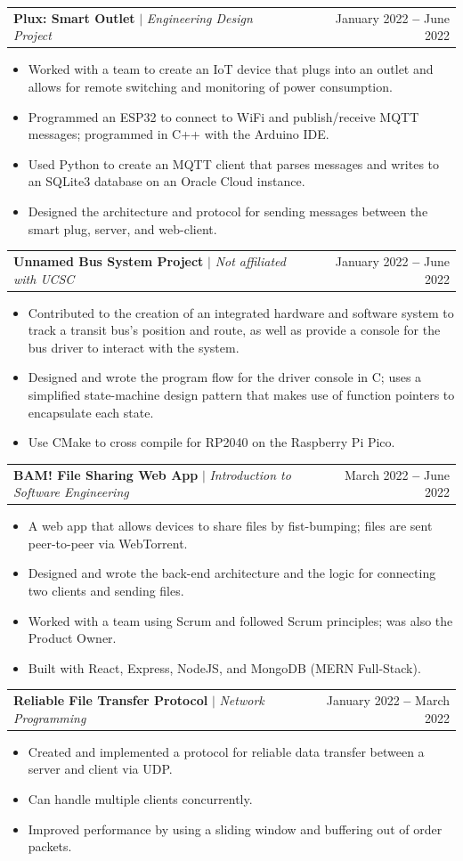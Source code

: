 \documentclass[letterpaper,11pt]{article}
\makeatletter
\newcommand{\resumeItem}[1]{
  \item\small{
    {#1 \vspace{-2pt}}
  }
}
\newcommand{\resumeProjectHeading}[2]{
    \vspace{-2pt}\item
    \begin{tabular*}{0.97\textwidth}{l@{\extracolsep{\fill}}r}
      \small#1 & #2 \\
    \end{tabular*}\vspace{-7pt}
}
\newcommand{\resumeItemListStart}{\begin{itemize}}
\newcommand{\resumeItemListEnd}{\end{itemize}\vspace{-5pt}}
\makeatother
\begin{document}
      \resumeProjectHeading
        {\textbf{Plux: Smart Outlet} $|$ \emph{Engineering Design Project}}{January 2022 \textbf{--} June 2022}
          \resumeItemListStart
            \resumeItem{Worked with a team to create an IoT device that plugs into an outlet and allows for remote switching and monitoring of power consumption.}
            \resumeItem{Programmed an ESP32 to connect to WiFi and publish/receive MQTT messages; programmed in C++ with the Arduino IDE.}
            \resumeItem{Used Python to create an MQTT client that parses messages and writes to an SQLite3 database on an Oracle Cloud instance.}
            \resumeItem{Designed the architecture and protocol for sending messages between the smart plug, server, and web-client.}
          \resumeItemListEnd

      \resumeProjectHeading
        {\textbf{Unnamed Bus System Project} $|$ \emph{Not affiliated with UCSC}}{January 2022 \textbf{--} June 2022}
          \resumeItemListStart
            \resumeItem{Contributed to the creation of an integrated hardware and software system to track a transit bus's position and route, as well as provide a console for the bus driver to interact with the system.}
            \resumeItem{Designed and wrote the program flow for the driver console in C; uses a simplified state-machine design pattern that makes use of function pointers to encapsulate each state.}
            \resumeItem{Use CMake to cross compile for RP2040 on the Raspberry Pi Pico.}
          \resumeItemListEnd

      \resumeProjectHeading
        {\textbf{BAM! File Sharing Web App} $|$ \emph{Introduction to Software Engineering}}{March 2022 \textbf{--} June 2022}
          \resumeItemListStart
            \resumeItem{A web app that allows devices to share files by fist-bumping; files are sent peer-to-peer via WebTorrent.}
            \resumeItem{Designed and wrote the back-end architecture and the logic for connecting two clients and sending files.}
            \resumeItem{Worked with a team using Scrum and followed Scrum principles; was also the Product Owner.}
            \resumeItem{Built with React, Express, NodeJS, and MongoDB (MERN Full-Stack).}
          \resumeItemListEnd

      \resumeProjectHeading
        {\textbf{Reliable File Transfer Protocol} $|$ \emph{Network Programming}}{January 2022 \textbf{--} March 2022}
          \resumeItemListStart
            \resumeItem{Created and implemented a protocol for reliable data transfer between a server and client via UDP.}
            \resumeItem{Can handle multiple clients concurrently.}
            \resumeItem{Improved performance by using a sliding window and buffering out of order packets.}
          \resumeItemListEnd
\end{document}
